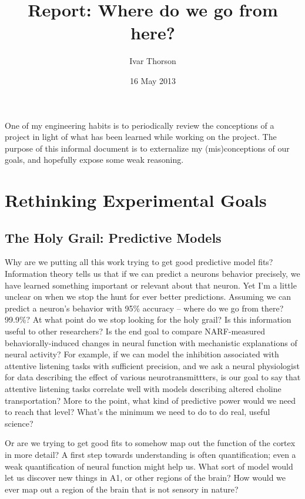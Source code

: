 \documentclass[11pt]{article}
\title{Report: Where do we go from here?}
\author{Ivar Thorson}
\date{16 May 2013}
\begin{document}
\maketitle


  One of my engineering habits is to periodically review the conceptions of a project in light of what has been learned while working on the project. The purpose of this informal document is to externalize my (mis)conceptions of our goals, and hopefully expose some weak reasoning. 

\section{Rethinking Experimental Goals}
\label{sec-1}


\subsection{The Holy Grail: Predictive Models}
\label{sec-1.1}


   Why are we putting all this work trying to get good predictive model fits? Information theory tells us that if we can predict a neurons behavior precisely, we have learned something important or relevant about that neuron. Yet I'm a little unclear on when we stop the hunt for ever better predictions. Assuming we can predict a neuron's behavior with 95\% accuracy -- where do we go from there? 99.9\%? At what point do we stop looking for the holy grail? Is this information useful to other researchers? Is the end goal to compare NARF-measured behaviorally-induced changes in neural function with mechanistic explanations of neural activity? For example, if we can model the inhibition associated with attentive listening tasks with sufficient precision, and we ask a neural physiologist for data describing the effect of various neurotransmittters, is our goal to say that attentive listening tasks correlate well with models describing altered choline transportation? More to the point, what kind of predictive power would we need to reach that level? What's the minimum we need to do to do real, useful science?

   Or are we trying to get good fits to somehow map out the function of the cortex in more detail? A first step towards understanding is often quantification; even a weak quantification of neural function might help us. What sort of model would let us discover new things in A1, or other regions of the brain? How would we ever map out a region of the brain that is not sensory in nature?
\end{document}
